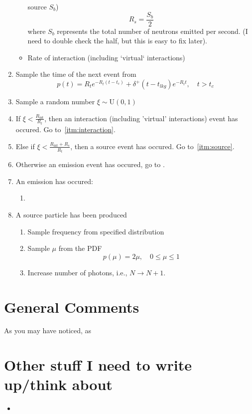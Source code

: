 \documentclass{article}
\newcommand{\Rin}{\ensuremath{R_{\text{int}}}}
\begin{document}
\begin{enumerate}
\begin{itemize}
source $S_b$)
\begin{equation}
  R_s = \frac{S_b}{2} 
\end{equation}
where $S_b$ represents the total number of neutrons emitted per second. (I need
to double check the half, but this is easy to fix later).
  \item Rate of interaction (including `virtual` interactions)
\end{itemize}
\item Sample the time of the next event from
\begin{equation}
 p(t) = R_t e^{-R_t (t-t_c)} + \delta^+(t-t_{lkg})e^{-R_t t}, \quad   t > t_c
\end{equation}
\item Sample a random number $\xi\sim\text{U}(0,1)$
\item If $\xi < \frac{\Rin}{R_{t}}$, then an interaction (including 'virtual'
interactions) event has occured. Go to~\ref{itm:interaction}.
\item Else if $\xi < \frac{\Rin+R_s}{R_t}$, then a source event has occured.
Go to~\ref{itm:source}.
\item Otherwise an emission event has occured, go to \label{itm:emission}.
\item \label{itm:emission} An emission has occured:
 \begin{enumerate}
    \item
  \end{enumerate}

\item \label{itm:source} A source particle has been produced
\begin{enumerate}
    \item Sample frequency from specified distribution
    \item Sample $\mu$ from the PDF
    \begin{equation}
      p(\mu) = 2\mu, \quad 0\leq\mu\leq 1
    \end{equation}
    \item Increase number of photons, i.e., $N\rightarrow N+1$.
\end{enumerate}
\end{enumerate}
 
\section{General Comments}

As you may have noticed, as 

\section{Other stuff I need to write up/think about}

\begin{itemize}
 \item
\end{itemize}




\end{document}
